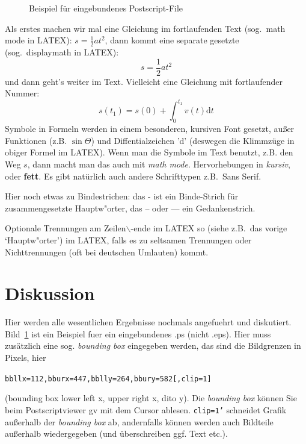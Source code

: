 \documentclass[12pt, a4paper]{article}
\begin{document}

\begin{figure}[h]
  \centering
  \caption{Beispiel f\"ur eingebundenes Postscript-File}
  \label{ps}
\end{figure}

Als erstes machen wir mal eine Gleichung im fortlaufenden Text (sog.\ math mode in LATEX): $s=\frac{1}{2}
a t^2$, dann kommt eine separate gesetzte (sog.\ displaymath in LATEX):
\[         s=\frac{1}{2}a t^2              \]  %
und dann geht's weiter im Text. Vielleicht eine Gleichung mit fortlaufender 
Nummer:
\begin{equation}
 s(t_1)=s(0) + \int_0^{t_1} v(t)\mbox{d}t 
\end{equation}
Symbole in Formeln werden in einem besonderen, kursiven Font
gesetzt, au\ss er Funktionen (z.B. $\sin\Theta$) und Diffentialzeichen 'd' 
(deswegen die Klimmz\"uge in obiger Formel im LATEX). Wenn man die Symbole im
Text benutzt, z.B. den Weg $s$, dann macht man das auch mit {\em math mode}.
Hervorhebungen in {\em kursiv}, oder {\bf fett}. Es gibt nat\"urlich auch 
andere
Schrifttypen z.B.\ {\sf Sans Serif}.

Hier noch etwas zu Bindestrichen: das - ist ein Binde-Strich f\"ur 
zusammengesetzte Haupt\-w"or\-ter, das -- oder --- ein Gedankenstrich. 

Optionale
Trennungen am Zeilen$\backslash$-ende im LATEX so (siehe z.B.\ das vorige 
`Haupt\-w"or\-ter') im LATEX, falls es zu seltsamen
Trennungen oder Nichttrennungen (oft bei deutschen Umlauten) kommt.

\section{Diskussion}

Hier werden alle wesentlichen Ergebnisse nochmals angefuehrt und diskutiert. 
Bild~\ref{ps} 
ist ein Beispiel fuer ein eingebundenes .ps (nicht .eps).
Hier muss zus\"atzlich eine sog. {\em bounding box} eingegeben werden, das 
sind die Bildgrenzen in Pixels, hier\\
\centerline{\tt bbllx=112,bburx=447,bblly=264,bbury=582[,clip=1]}
(bounding box lower left x, upper right x, dito y). Die {\it bounding box} 
k\"onnen Sie beim Postscriptviewer gv mit dem Cursor ablesen. {\tt clip=1'}
schneidet Grafik au\ss erhalb der {\it bounding box} ab, andernfalls 
k\"onnen werden auch Bildteile au\ss erhalb wiedergegeben (und \"uberschreiben
ggf. Text etc.).
\end{document}
